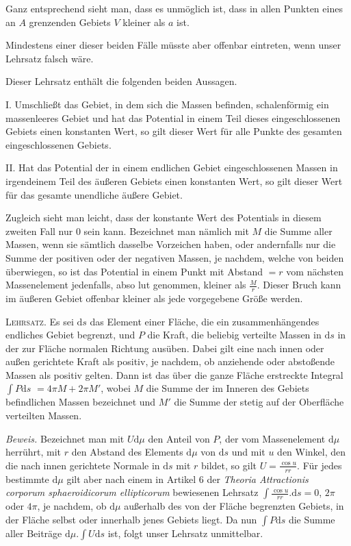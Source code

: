 Ganz entsprechend sieht man, dass es unmöglich ist, dass in allen Punkten eines an $A$ grenzenden Gebiets $V$ kleiner als $a$ ist.

Mindestens einer dieser beiden Fälle müsste aber offenbar eintreten, wenn unser Lehrsatz falsch wäre.

Dieser Lehrsatz enthält die folgenden beiden Aussagen.

I. Umschließt das Gebiet, in dem sich die Massen befinden, schalenförmig ein massenleeres Gebiet und hat das Potential in einem Teil dieses eingeschlossenen Gebiets einen konstanten Wert, so gilt dieser Wert für alle Punkte des gesamten eingeschlossenen Gebiets.

II. Hat das Potential der in einem endlichen Gebiet eingeschlossenen Massen in irgendeinem Teil des äußeren Gebiets einen konstanten Wert, so gilt dieser Wert für das gesamte unendliche äußere Gebiet.

Zugleich sieht man leicht, dass der konstante Wert des Potentials in diesem zweiten Fall nur $0$ sein kann. Bezeichnet man nämlich mit $M$ die Summe aller Massen, wenn sie sämtlich dasselbe Vorzeichen haben, oder andernfalls nur die Summe der positiven oder der negativen Massen, je nachdem, welche von beiden überwiegen, so ist das Potential in einem Punkt mit Abstand $=r$ vom nächsten Massenelement jedenfalls, abso%
%
lut genommen, kleiner als $\frac Mr$. Dieser Bruch kann im äußeren Gebiet offenbar kleiner als jede vorgegebene Größe werden.

\textsc{Lehrsatz.} Es sei $\mathrm ds$ das Element einer Fläche, die ein zusammenhängendes endliches Gebiet begrenzt, und $P$ die Kraft, die beliebig verteilte Massen in $\mathrm ds$ in der zur Fläche normalen Richtung ausüben. Dabei gilt eine nach innen oder außen gerichtete Kraft als positiv, je nachdem, ob anziehende oder abstoßende Massen als positiv gelten. Dann ist das über die ganze Fläche erstreckte Integral $\int P\mathrm ds$ $=4\pi M+2\pi M'$, wobei $M$ die Summe der im Inneren des Gebiets befindlichen Massen bezeichnet und $M'$ die Summe der stetig auf der Oberfläche verteilten Massen.

\textit{Beweis.} Bezeichnet man mit $U\mathrm d\mu$ den Anteil von $P$, der vom Massenelement $\mathrm d\mu$ herrührt, mit $r$ den Abstand des Elements $\mathrm d\mu$ von $\mathrm ds$ und mit $u$ den Winkel, den die nach innen gerichtete Normale in $\mathrm ds$ mit $r$ bildet, so gilt $U=\frac{\cos u}{rr}$. Für jedes bestimmte $\mathrm d\mu$ gilt aber nach einem in Artikel 6 der \textit{Theoria Attractionis corporum sphaeroidicorum ellipticorum} bewiesenen Lehrsatz $\int\frac{\cos u}{rr}.\mathrm ds=0$, $2\pi$ oder $4\pi$, je nachdem, ob $\mathrm d\mu$ außerhalb des von der Fläche begrenzten Gebiets, in der Fläche selbst oder innerhalb jenes Gebiets liegt. Da nun $\int P\mathrm ds$ die Summe aller Beiträge $\mathrm d\mu.\int U\mathrm ds$ ist, folgt unser Lehrsatz unmittelbar.

